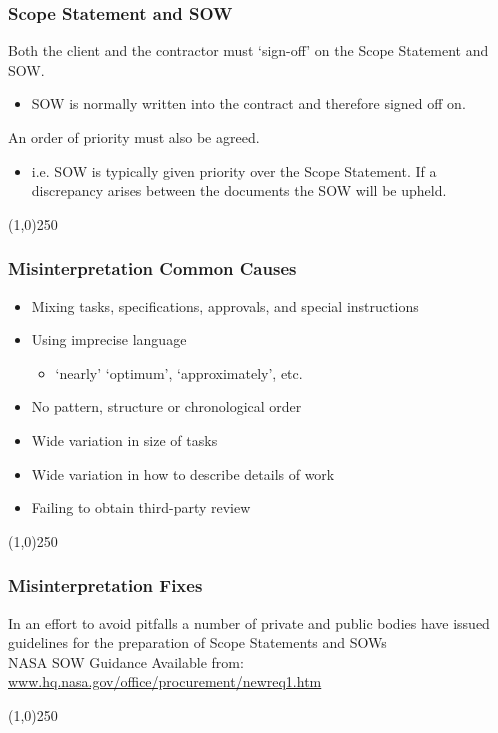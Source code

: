 \begin{frame}
\frametitle{Scope Statement and SOW}
Both the client and the contractor must `sign-off' on the Scope Statement and SOW.
\begin{itemize}
	\item SOW is normally written into the contract and therefore signed off on.
\end{itemize}
An order of priority must also be agreed.
\begin{itemize}
	\item i.e. SOW is typically given priority over the Scope Statement.  If a discrepancy arises between the documents the SOW will be upheld.
\end{itemize}
\end{frame}\begin{center}\line(1,0){250}\end{center}



\begin{frame}
\frametitle{Misinterpretation \hfill Common Causes}
\begin{itemize}
	\item Mixing tasks, specifications, approvals, and special instructions
	\item Using imprecise language
	\begin{itemize}
		\item `nearly' `optimum', `approximately', etc.
	\end{itemize}	
	\item No pattern, structure or chronological order
	\item Wide variation in size of tasks
	\item Wide variation in how to describe details of work
	\item Failing to obtain third-party review
\end{itemize}
\end{frame}\begin{center}\line(1,0){250}\end{center}



\begin{frame}
\frametitle{Misinterpretation \hfill Fixes}
In an effort to avoid pitfalls a number of private and public bodies have issued guidelines for the preparation of Scope Statements and SOWs\\
NASA SOW Guidance Available from: \href{http://www.hq.nasa.gov/office/procurement/newreq1.htm}{www.hq.nasa.gov/office/procurement/newreq1.htm}
\end{frame}\begin{center}\line(1,0){250}\end{center}



